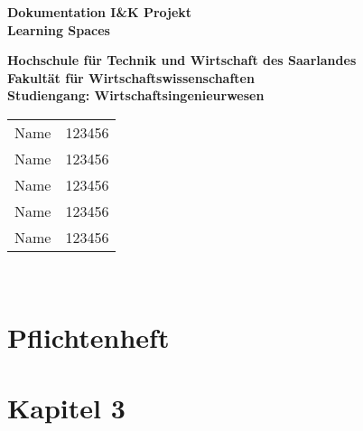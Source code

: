 \documentclass[a4paper,12pt]{article}
\begin{document}
\begin{titlepage}															%

\vfill

\begin{center}
	{\textbf{\LARGE{Dokumentation I\&K Projekt\\ {\flqq Learning Spaces\frqq}}}}
\end{center}

\vfill
\textbf{Hochschule für Technik und Wirtschaft des Saarlandes}\\
\textbf{Fakultät für Wirtschaftswissenschaften}\\
\textbf{Studiengang: Wirtschaftsingenieurwesen}\\
\vfill

\begin{tabular}{lc}
Name & 123456 \\
Name & 123456 \\
Name & 123456 \\
Name & 123456 \\
Name & 123456 \\
\end{tabular}\\

\end{titlepage}																%

\thispagestyle{empty}
\newpage 																	%

\renewcommand{\thesection}{\Roman{section}}


\tableofcontents
\pagestyle{plain}
\clearpage

\setcounter{section}{0}
\renewcommand{\thesection}{\arabic{section}}




\section{Pflichtenheft}

\section{Kapitel 3}
\end{document}
